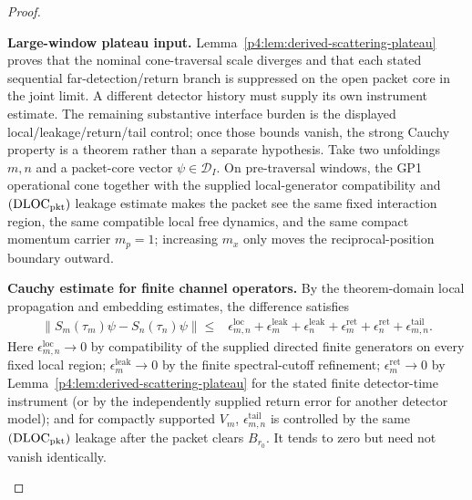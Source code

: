 \documentclass[12pt,a4paper]{article}
\begin{document}
\begin{proof}
\begin{proofsteps}

\item \textbf{Large-window plateau input.}
Lemma~\ref{p4:lem:derived-scattering-plateau} proves that the nominal
cone-traversal scale diverges and that each stated sequential
far-detection/return branch is suppressed on the open packet core in the
joint limit.  A different detector history must supply its own instrument
estimate.  The remaining substantive interface burden is the displayed
local/leakage/return/tail control; once those bounds vanish, the strong
Cauchy property is a theorem rather than a separate hypothesis.
Take two unfoldings \(m,n\) and a packet-core vector
\(\psi\in\mathcal D_I\).
On pre-traversal windows, the GP1 operational cone together with the
supplied local-generator compatibility and
\((\mathrm{DLOC}_{\rm pkt})\) leakage estimate makes
the packet see the same fixed interaction region, the same compatible local
free dynamics, and the same compact momentum carrier \(m_p=1\); increasing
\(m_x\) only moves the reciprocal-position boundary outward.

\item \textbf{Cauchy estimate for finite channel operators.}
By the theorem-domain local propagation and embedding estimates, the
difference satisfies
\[
\begin{aligned}
\bigl\|S_m(\tau_m)\psi-S_n(\tau_n)\psi\bigr\|
\le{}&
\epsilon^{\mathrm{loc}}_{m,n}
+
\epsilon^{\mathrm{leak}}_m+
\epsilon^{\mathrm{leak}}_n
+
\epsilon^{\mathrm{ret}}_m+
\epsilon^{\mathrm{ret}}_n
+
\epsilon^{\mathrm{tail}}_{m,n} .
\end{aligned}
\]
Here \(\epsilon^{\mathrm{loc}}_{m,n}\to0\) by compatibility of the supplied
directed finite generators on every fixed local region;
\(\epsilon^{\mathrm{leak}}_m\to0\) by the finite spectral-cutoff refinement;
\(\epsilon^{\mathrm{ret}}_m\to0\) by
Lemma~\ref{p4:lem:derived-scattering-plateau} for the stated finite
detector-time instrument (or by the independently supplied return error for
another detector model); and for compactly supported
\(V_m\), \(\epsilon^{\mathrm{tail}}_{m,n}\) is controlled by the same
\((\mathrm{DLOC}_{\rm pkt})\) leakage after the packet clears \(B_{r_0}\).
It tends to zero
but need not vanish identically.


\end{proofsteps}
\end{proof}
\end{document}
